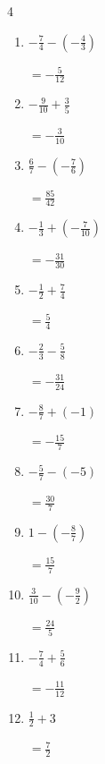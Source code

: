 \begin{multicols}{4}
\begin{enumerate}
  \item $\displaystyle -\frac{7}{4} - \left(-\frac{4}{3}\right)$

        $\displaystyle =-\frac{5}{12}$

  \item $\displaystyle -\frac{9}{10} + \frac{3}{5}$

        $\displaystyle =-\frac{3}{10}$

  \item $\displaystyle \frac{6}{7} - \left(-\frac{7}{6}\right)$

        $\displaystyle =\frac{85}{42}$

  \item $\displaystyle -\frac{1}{3} + \left(-\frac{7}{10}\right)$

        $\displaystyle =-\frac{31}{30}$

  \item $\displaystyle -\frac{1}{2} + \frac{7}{4}$

        $\displaystyle =\frac{5}{4}$

  \item $\displaystyle -\frac{2}{3} - \frac{5}{8}$

        $\displaystyle =-\frac{31}{24}$

  \item $\displaystyle -\frac{8}{7} + \left(-1\right)$

        $\displaystyle =-\frac{15}{7}$

  \item $\displaystyle -\frac{5}{7} - \left(-5\right)$

        $\displaystyle =\frac{30}{7}$

\columnbreak %

  \item $\displaystyle 1 - \left(-\frac{8}{7}\right)$

        $\displaystyle =\frac{15}{7}$

  \item $\displaystyle \frac{3}{10} - \left(-\frac{9}{2}\right)$

        $\displaystyle =\frac{24}{5}$

  \item $\displaystyle -\frac{7}{4} + \frac{5}{6}$

        $\displaystyle =-\frac{11}{12}$

  \item $\displaystyle \frac{1}{2} + 3$

        $\displaystyle =\frac{7}{2}$


\end{enumerate}
\end{multicols}
